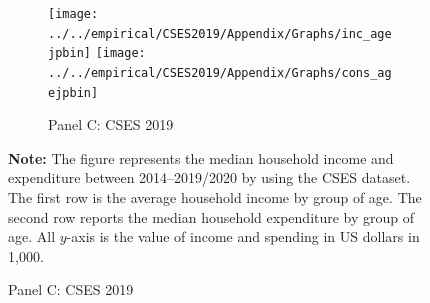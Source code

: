 \documentclass[11pt,letterpaper]{article}
\begin{document}
\begin{figure}
\begin{subfigure}[b]{0.33\linewidth}
		\vspace{-2.5em}
		\newline {}
	\end{subfigure}
	\hfil
	\begin{subfigure}[b]{0.33\linewidth}
		\caption*{Panel C: CSES 2019} \vspace{-.5em}
		\label{fig:3c}
		\texttt{[image: ../../empirical/CSES2019/Appendix/Graphs/inc\_agejpbin]} 
		\vspace{-2.5em}
		\newline {}
		\texttt{[image: ../../empirical/CSES2019/Appendix/Graphs/cons\_agejpbin]} 
		\vspace{-2.5em}
		\newline {}
	\end{subfigure}
	
		\begin{tablenotes}
		\footnotesize
		\item \textbf{Note:} The figure represents the median household income and expenditure between 2014--2019/2020 by using the CSES dataset. The first row is the average household income by group of age. The second row reports the median household expenditure by group of age. All $y$-axis is the value of income and spending in US dollars in 1,000. 
	\end{tablenotes} 
\end{figure}


\end{document}
